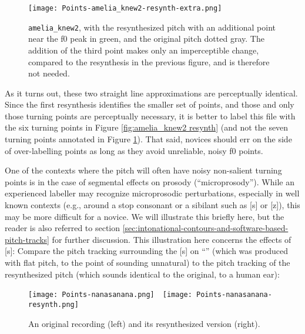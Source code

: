 \begin{figure}[H]
\centering
%
\texttt{[image: Points-amelia\_knew2-resynth-extra.png]}
%
\caption[\texttt{amelia\_knew2}, with the resynthesized pitch with an additional point.]{\texttt{amelia\_knew2}, with the resynthesized pitch with an additional point near the f0 peak in green, and the original pitch dotted gray. The addition of the third point makes only an imperceptible change, compared to the resynthesis in the previous figure, and is therefore not needed.%
\label{fig:amelia_knew2 resynth extra}%
}
\end{figure}

As it turns out, these two straight line approximations are perceptually identical. Since the first resynthesis identifies the smaller set of points, and those and only those turning points are perceptually necessary, it is better to label this file with the six turning points in Figure \ref{fig:amelia_knew2 resynth} (and not the seven turning points annotated in Figure \ref{fig:amelia_knew2 resynth extra}). That said, novices should err on the side of over-labelling points as long as they avoid unreliable, noisy f0 points.

One of the contexts where the pitch will often have noisy non-salient turning points is in the case of segmental effects on prosody (“microprosody”). While an experienced labeller may recognize microprosodic perturbations, especially in well known contexts (e.g., around a stop consonant or a sibilant such as [s] or [z]), this may be more difficult for a novice. We will illustrate this briefly here, but the reader is also referred to section \ref{sec:intonational-contours-and-software-based-pitch-tracks} for further discussion. This illustration here concerns the effects of [s]: Compare the pitch tracking surrounding the [s] on “” (which was produced with flat pitch, to the point of sounding unnatural) to the pitch tracking of the resynthesized pitch (which sounds identical to the original, to a human ear):

\begin{figure}[H]
\centering
%
\texttt{[image: Points-nanasanana.png]}~~\texttt{[image: Points-nanasanana-resynth.png]}
%
\caption{An original recording (left) and its resynthesized version (right).%
\label{fig:original and resynth}%
}
\end{figure}

